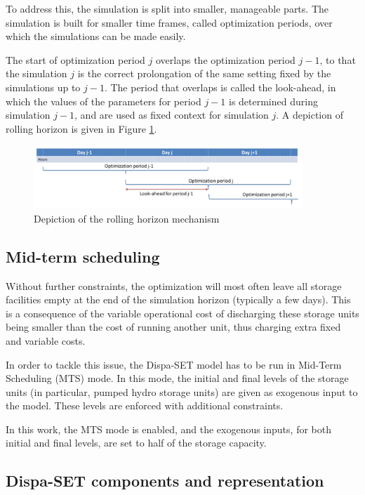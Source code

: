 To address this, the simulation is split into smaller, manageable parts. The simulation is built for smaller time frames, called optimization periods, over which the simulations can be made easily.

The start of optimization period $j$ overlaps the optimization period $j-1$, to that the simulation $j$ is the correct prolongation of the same setting fixed by the simulations up to $j-1$. The period that overlaps is called the look-ahead, in which the values of the parameters for period $j-1$ is determined during simulation $j-1$, and are used as fixed context for simulation $j$. A depiction of rolling horizon is given in Figure \ref{fig:rolling-horizon}.

\begin{figure}[h]
    \centering
    \includegraphics[width=0.9\textwidth]{resources/images/rolling_horizon.png}
    \caption{Depiction of the rolling horizon mechanism}
    \label{fig:rolling-horizon}
\end{figure}

\subsection{Mid-term scheduling}

Without further constraints, the optimization will most often leave all storage facilities empty at the end of the simulation horizon (typically a few days). This is a consequence of the variable operational cost of discharging these storage units being smaller than the cost of running another unit, thus charging extra fixed and variable costs.

In order to tackle this issue, the Dispa-SET model has to be run in Mid-Term Scheduling (MTS) mode. In this mode, the initial and final levels of the storage units (in particular, pumped hydro storage units) are given as exogenous input to the model. These levels are enforced with additional constraints.

In this work, the MTS mode is enabled, and the exogenous inputs, for both initial and final levels, are set to half of the storage capacity.

\subsection{Dispa-SET components and representation}

